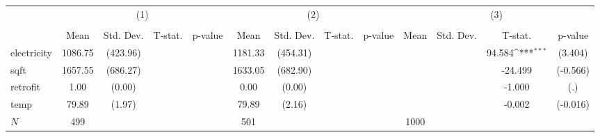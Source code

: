 {
\def\sym#1{\ifmmode^{#1}\else\(^{#1}\)\fi}
\begin{tabular}{l*{3}{cccc}}
\hline\hline
            &\multicolumn{4}{c}{(1)}                                     &\multicolumn{4}{c}{(2)}                                     &\multicolumn{4}{c}{(3)}                                     \\
            &\multicolumn{4}{c}{}                                        &\multicolumn{4}{c}{}                                        &\multicolumn{4}{c}{}                                        \\
            &        Mean&   Std. Dev.&     T-stat.         &     p-value&        Mean&   Std. Dev.&     T-stat.         &     p-value&        Mean&   Std. Dev.&     T-stat.         &     p-value\\
\hline
electricity &     1086.75&    (423.96)&                     &            &     1181.33&    (454.31)&                     &            &            &            &      94.584\sym{***}&     (3.404)\\
sqft        &     1657.55&    (686.27)&                     &            &     1633.05&    (682.90)&                     &            &            &            &     -24.499         &    (-0.566)\\
retrofit    &        1.00&      (0.00)&                     &            &        0.00&      (0.00)&                     &            &            &            &      -1.000         &         (.)\\
temp        &       79.89&      (1.97)&                     &            &       79.89&      (2.16)&                     &            &            &            &      -0.002         &    (-0.016)\\
\hline
\(N\)       &         499&            &                     &            &         501&            &                     &            &        1000&            &                     &            \\
\hline\hline
\end{tabular}
}
